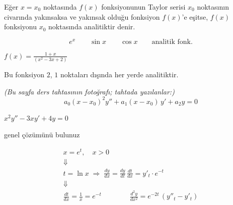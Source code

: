 \documentclass[11pt,a4paper]{article}
\begin{document}
\begin{tanim}
Eğer $x=x_0$ noktasında $f(x)$ fonksiyonunun Taylor serisi $x_0$ noktasının civarında yakınsaksa ve yakınsak olduğu
fonksiyon $f(x)$'e eşitse, $f(x)$ fonksiyonu $x_0$ noktasında analitiktir denir.
\end{tanim}
\[ e^x \qquad \sin x \qquad \cos x \qquad \text{analitik fonk.} \]
\noindent\begin{minipage}[c]{0.35\linewidth}\centering
$\displaystyle f(x) = \frac{1+x}{(x^2-3x+2)}$
\end{minipage}\hfill
\begin{minipage}[c]{0.6\linewidth}
Bu fonksiyon $2$, $1$ noktaları dışında her yerde analitiktir.
\end{minipage}

{\small\itshape (Bu sayfa ders tahtasının fotoğrafı; tahtada yazılanlar:)}
\[ a_0(x-x_0)^2y'' + a_1(x-x_0)\,y' + a_2y = 0 \]
\begin{ornek}
$x^2y'' - 3xy' + 4y = 0$

 genel çözümünü bulunuz
\end{ornek}
\begin{gather*}
x=e^t,\quad x>0\\
\Downarrow\\
t=\ln x \;\Rightarrow\; \frac{dy}{dx} = \frac{dy}{dt}\,\frac{dt}{dx} = y'_t\cdot e^{-t}\\
\Downarrow\\
\frac{dt}{dx} = \frac{1}{x} = e^{-t} \qquad\qquad \frac{d^2y}{dx^2} = e^{-2t}\,(y''_t - y'_t)
\end{gather*}
\end{document}
